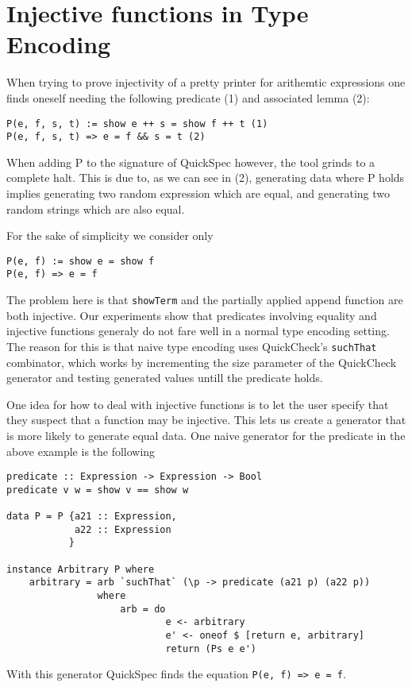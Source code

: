 \section{Injective functions in Type Encoding}
When trying to prove injectivity of a pretty printer for arithemtic expressions one
finds oneself needing the following predicate (1) and associated lemma (2):
\begin{verbatim}
P(e, f, s, t) := show e ++ s = show f ++ t (1)
P(e, f, s, t) => e = f && s = t (2)
\end{verbatim}
When adding P to the signature of QuickSpec however, the tool grinds to a complete halt. This is
due to, as we can see in (2), generating data where P holds implies generating two
random expression which are equal, and generating two random strings which are also equal.

For the sake of simplicity we consider only
\begin{verbatim}
P(e, f) := show e = show f
P(e, f) => e = f
\end{verbatim}

The problem here is that \texttt{showTerm} and the partially applied append function are both injective.
Our experiments show that predicates involving equality and injective functions generaly do not
fare well in a normal type encoding setting. The reason for this is that naive type encoding uses
QuickCheck's \texttt{suchThat} combinator, which works by incrementing the size parameter of the QuickCheck
generator and testing generated values untill the predicate holds.

One idea for how to deal with injective functions is to let the user specify that they suspect that 
a function may be injective. This lets us create a generator that is more likely to generate
equal data. One naive generator for the predicate in the above example is the following
\begin{verbatim}
predicate :: Expression -> Expression -> Bool
predicate v w = show v == show w

data P = P {a21 :: Expression,
            a22 :: Expression
           }

instance Arbitrary P where
    arbitrary = arb `suchThat` (\p -> predicate (a21 p) (a22 p))
                where
                    arb = do
                            e <- arbitrary
                            e' <- oneof $ [return e, arbitrary]
                            return (Ps e e')
\end{verbatim}
With this generator QuickSpec finds the equation \texttt{P(e, f) => e = f}.

